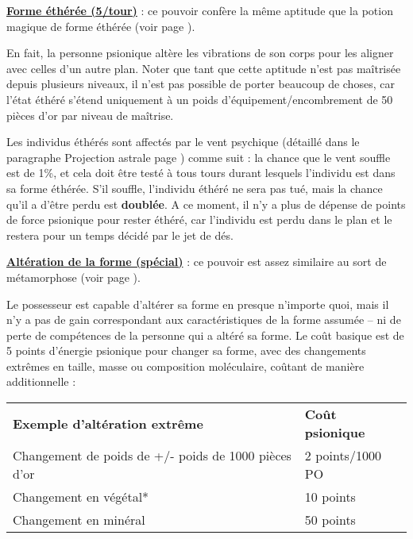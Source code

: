 \bigskip

\label{magicien-forme-etheree}\textbf{\uline{Forme éthérée (5/tour)}} : ce pouvoir confère la même aptitude que la potion magique de forme éthérée (voir page \pageref{objet-huile-etheree}).

\bigskip

En fait, la personne psionique altère les vibrations de son corps pour les aligner avec celles d'un autre plan. Noter que tant que cette aptitude n'est pas maîtrisée depuis plusieurs niveaux, il n'est pas possible de porter beaucoup de choses, car l'état éthéré s'étend uniquement à un poids d'équipement/encombrement de 50 pièces d'or par niveau de maîtrise.

\bigskip

Les individus éthérés sont affectés par le vent psychique (détaillé dans le paragraphe Projection astrale page \pageref{guerrier-projection-astrale}) comme suit : la chance que le vent souffle est de 1\%, et cela doit être testé à tous tours durant lesquels l'individu est dans sa forme éthérée. S'il souffle, l'individu éthéré ne sera pas tué, mais la chance qu'il a d'être perdu est \textbf{doublée}. A ce moment, il n'y a plus de dépense de points de force psionique pour rester éthéré, car l'individu est perdu dans le plan et le restera pour un temps décidé par le jet de dés.

\bigskip

\label{magicien-alteration-forme}\textbf{\uline{Altération de la forme (spécial)}} : ce pouvoir est assez similaire au sort de métamorphose (voir page \pageref{sort-metamorphose}).

\bigskip

Le possesseur est capable d'altérer sa forme en presque n'importe quoi, mais il n'y a pas de gain correspondant aux caractéristiques de la forme assumée -- ni de perte de compétences de la personne qui a altéré sa forme. Le coût basique est de 5 points d'énergie psionique pour changer sa forme, avec des changements extrêmes en taille, masse ou composition moléculaire, coûtant de manière additionnelle :

\bigskip

\begin{tabular}{ll}
\textbf{Exemple d'altération extrême} & \textbf{Coût psionique} \\
Changement de poids de +/- poids de 1000 pièces d'or & 2 points/1000 PO \\
Changement en végétal* & 10 points \\
Changement en minéral & 50 points \\
\end{tabular}

